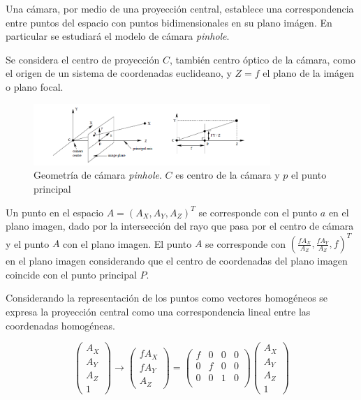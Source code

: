 Una cámara, por medio de una proyección central, establece una correspondencia entre puntos del espacio con puntos bidimensionales en su plano imágen. En particular se estudiará el modelo de cámara \emph{pinhole}\cite{LibroCompGrafica3}.

Se considera el centro de proyección $C$, también centro óptico de la cámara, como el origen de un sistema de coordenadas euclideano, y $Z = f$ el plano de la imágen o plano focal.

\begin{figure}[H]
  \centering
    \includegraphics[width=0.8\textwidth]{./Cap6_reconstruccion/pinhole.png}
  \caption{Geometría de cámara \emph{pinhole}. $C$ es centro de la cámara y $p$ el punto principal}
  \label{fig:Calib-Pinhole}
\end{figure}

Un punto en el espacio $A=(A_X, A_Y, A_Z)^T$ se corresponde con el punto $a$ en el plano imagen, dado por la intersección del rayo que pasa por el centro de cámara y el punto $A$ con el plano imagen. El punto $A$ se corresponde con $(\frac{fA_X}{A_Z}, \frac{fA_Y}{A_Z}, f)^T$ en el plano imagen considerando que el centro de coordenadas del plano imagen coincide con el punto principal $P$.

Considerando la representación de los puntos como vectores homogéneos se expresa la proyección central como una correspondencia lineal entre las coordenadas homogéneas.

\[
\begin{pmatrix}
A_X \\ A_Y \\ A_Z \\ 1
\end{pmatrix}
\to
\begin{pmatrix}
fA_X \\ fA_Y \\ A_Z
\end{pmatrix}
=
\begin{pmatrix}
f & 0 & 0 & 0 \\
0 & f & 0 & 0 \\
0 & 0 & 1 & 0 \\
\end{pmatrix}
\begin{pmatrix}
A_X \\ A_Y \\ A_Z \\ 1
\end{pmatrix}
\]

